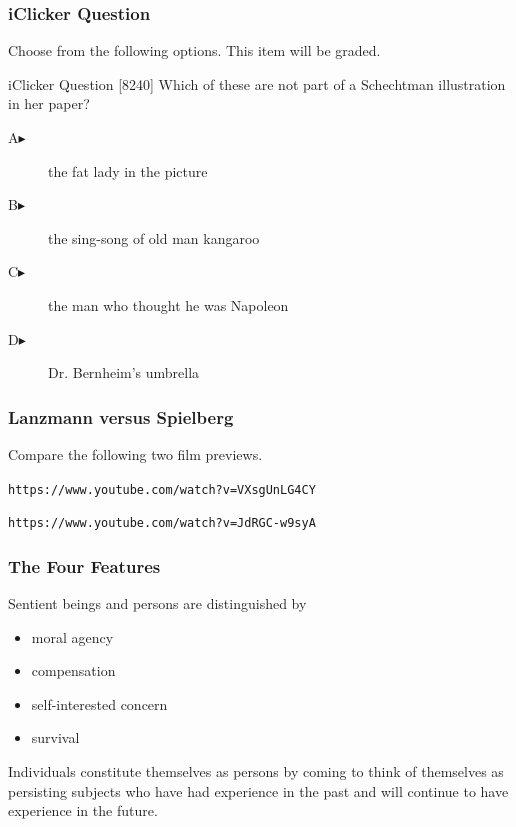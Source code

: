 \documentclass[xcolor=dvipsnames]{beamer}
\begin{document}
\begin{frame}
  \frametitle{iClicker Question}
Choose from the following options. This item will be graded.
\begin{block}{iClicker Question}
[8240] Which of these are not part of a Schechtman illustration in her paper?
\end{block}
\begin{description}
\item[A\hspace{.2in}$\blacktriangleright$] the fat lady in the picture
\item[B\hspace{.2in}$\blacktriangleright$] the sing-song of old man kangaroo
\item[C\hspace{.2in}$\blacktriangleright$] the man who thought he was Napoleon
\item[D\hspace{.2in}$\blacktriangleright$] Dr. Bernheim's umbrella
\end{description}
\end{frame}

\begin{frame}
  \frametitle{Lanzmann versus Spielberg}
  Compare the following two film previews.
  \begin{alltt}
    https://www.youtube.com/watch?v=VXsgUnLG4CY
  \end{alltt}
  \begin{alltt}
    https://www.youtube.com/watch?v=JdRGC-w9syA
  \end{alltt}
\end{frame}

\begin{frame}
  \frametitle{The Four Features}
  Sentient beings and persons are distinguished by
  \begin{itemize}
  \item moral agency
  \item compensation
  \item self-interested concern
  \item survival
  \end{itemize}
  Individuals constitute themselves as persons by coming to think of
  themselves as persisting subjects who have had experience in the
  past and will continue to have experience in the future.
\end{frame}
\end{document}
